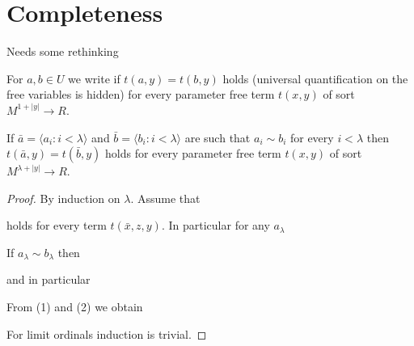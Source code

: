 \documentclass[11pt,oneside]{amsart}
\renewcommand*{\emph}[1]{%
   \smash{\tikz[baseline]\node[rectangle, fill=teal!25, rounded corners, inner xsep=0.5ex, inner ysep=0.2ex, anchor=base, minimum height = 2.7ex]{#1};}}
\begin{document}
\section{Completeness}

Needs some rethinking

For $a,b\in U$ we write \emph{$a\sim b$\/} if $t(a,y)=t(b,y)$ holds (universal quantification on the free variables is hidden) for every parameter free term $t(x,y)$ of sort $M^{1+|y|}\to R$. 

\begin{fact}
  If $\bar a=\langle a_i:i<\lambda\rangle$ and $\bar b=\langle b_i:i<\lambda\rangle$ are such that $a_i\sim b_i$ for every $i<\lambda$ then $t(\bar a,y)=t(\bar b,y)$ holds for every parameter free term $t(x,y)$ of sort $M^{\lambda+|y|}\to R$.
\end{fact}

\begin{proof}
  By induction on $\lambda$. Assume that
  

  holds for every term $t(\bar x,z,y)$.   
  In particular for any $a_\lambda$


  If $a_\lambda\sim b_\lambda$ then


  and in particular 


  From (1) and (2) we obtain


  For limit ordinals induction is trivial.
\end{proof}

\end{document}
